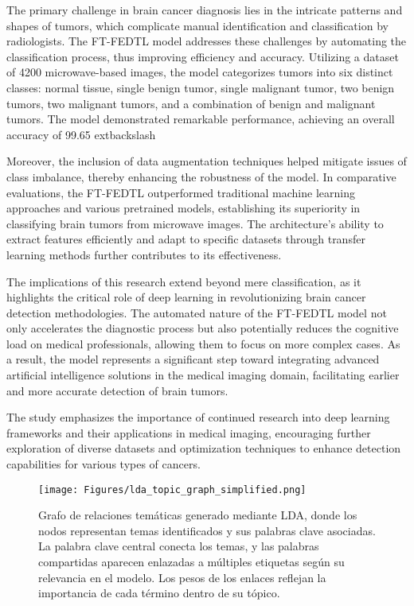 \documentclass[runningheads]{llncs}
\begin{document}
The primary challenge in brain cancer diagnosis lies in the intricate patterns and shapes of tumors, which complicate manual identification and classification by radiologists. The FT-FEDTL model addresses these challenges by automating the classification process, thus improving efficiency and accuracy. Utilizing a dataset of 4200 microwave-based images, the model categorizes tumors into six distinct classes: normal tissue, single benign tumor, single malignant tumor, two benign tumors, two malignant tumors, and a combination of benign and malignant tumors. The model demonstrated remarkable performance, achieving an overall accuracy of 99.65	extbackslash{}%

Moreover, the inclusion of data augmentation techniques helped mitigate issues of class imbalance, thereby enhancing the robustness of the model. In comparative evaluations, the FT-FEDTL outperformed traditional machine learning approaches and various pretrained models, establishing its superiority in classifying brain tumors from microwave images. The architecture's ability to extract features efficiently and adapt to specific datasets through transfer learning methods further contributes to its effectiveness.

The implications of this research extend beyond mere classification, as it highlights the critical role of deep learning in revolutionizing brain cancer detection methodologies. The automated nature of the FT-FEDTL model not only accelerates the diagnostic process but also potentially reduces the cognitive load on medical professionals, allowing them to focus on more complex cases. As a result, the model represents a significant step toward integrating advanced artificial intelligence solutions in the medical imaging domain, facilitating earlier and more accurate detection of brain tumors.

The study emphasizes the importance of continued research into deep learning frameworks and their applications in medical imaging, encouraging further exploration of diverse datasets and optimization techniques to enhance detection capabilities for various types of cancers.
\begin{figure}[h]
\centering
\texttt{[image: Figures/lda\_topic\_graph\_simplified.png]}
\caption{Grafo de relaciones temáticas generado mediante LDA, donde los nodos representan temas identificados y sus palabras clave asociadas. La palabra clave central conecta los temas, y las palabras compartidas aparecen enlazadas a múltiples etiquetas según su relevancia en el modelo. Los pesos de los enlaces reflejan la importancia de cada término dentro de su tópico.}
\end{figure}
\end{document}
